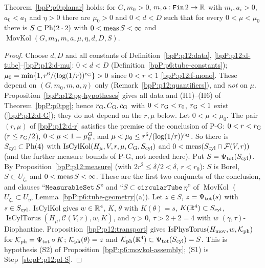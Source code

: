 \begin{theorem}\label{bpP:p12:planar}
Theorem~\ref{bpP:p0:planar} holds: for $G,m_0>0$, $m,a:\texttt{Fin}\,2\to\mathbb{R}$ with $m_i,a_i>0$, $a_0<a_1$ and $\eta>0$ there are $\mu_0>0$ and $0<d<D$ such that for every $0<\mu<\mu_0$ there is $S\subset\mathrm{Ph}(2\cdot2)$ with $0<\operatorname{meas} S<\infty$ and $\operatorname{MovKol}(G,m_0,m,a,\mu,\eta,d,D,S)$.
\end{theorem}
\begin{proof}
\label{stepP:p12:pl-const} Choose $d,D$ and all constants of Definition~\ref{bpP:p12:data}, \ref{bpP:p12:d-tube}--\ref{bpP:p12:d-mu}: $0<d<D$ (Definition~\ref{bpP:p6:tube-constants}); $\mu_0=\min\{1,r^6/(\log(1/r))^{c_{\rm G}}\}>0$ since $0<r<1$ \ref{bpP:p12:f-mono}. These depend on $(G,m_0,m,a,\eta)$ only (Remark~\ref{bpP:p12:quantifiers}), and \emph{not} on $\mu$.
\label{stepP:p12:pl-pg} Proposition~\ref{bpP:p12:pg-hypotheses} gives all data and (H1)--(H6) of Theorem~\ref{bpP:p0:pg}; hence $r_{\rm G},C_{\rm G},c_{\rm G}$ with $0<r_{\rm G}<r_0$, $r_{\rm G}<1$ exist (\ref{bpP:p12:d-G}); they do not depend on the $r,\mu$ below.
\label{stepP:p12:pl-mu} Let $0<\mu<\mu_0$. The pair $(r,\mu)$ of \ref{bpP:p12:d-r} satisfies the premise of the conclusion of P-G: $0<r<r_{\rm G}$ ($r\le r_{\rm G}/2$), $0<\mu<1=\mu_0^{\rm G}$, and $\mu<\mu_0\le r^6/(\log(1/r))^{c_{\rm G}}$. So there is $S_{\rm cyl}\subset\mathrm{Ph}(4)$ with $\operatorname{IsCylKol}(H_\mu,V,r,\mu,C_{\rm G},S_{\rm cyl})$ and $0<\operatorname{meas}(S_{\rm cyl}\cap\mathcal F(V,r))$ (and the further measure bounds of P-G, not needed here).
\label{stepP:p12:pl-S} Put $S=\Psi_{\rm tot}(S_{\rm cyl})$. By Proposition~\ref{bpP:p12:measure} (with $2r^2\le\delta/2<\delta$, $r<r_0$): $S$ is Borel, $S\subset U_{\zeta_*}$ and $0<\operatorname{meas} S<\infty$. These are the first two conjuncts of the conclusion, and clauses ``$\texttt{MeasurableSet}\ S$'' and ``$S\subset\texttt{circularTube}\ \eta$'' of $\operatorname{MovKol}$ ($U_{\zeta_*}\subset U_\eta$, Lemma~\ref{bpP:p6:tube-geometry}(a)).
\label{stepP:p12:pl-tori} Let $z\in S$, $z=\Psi_{\rm tot}(s)$ with $s\in S_{\rm cyl}$. IsCylKol gives $w\in\mathbb{R}^4$, $K$, $\theta$ with $K(\theta)=s$, $K(\mathbb{R}^4)\subset S_{\rm cyl}$, $\operatorname{IsCylTorus}(H_\mu,\mathcal C(V,r),w,K)$, and $\gamma>0$, $\tau>2+2=4$ with $w$ $(\gamma,\tau)$-Diophantine. Proposition~\ref{bpP:p12:transport} gives $\operatorname{IsPhysTorus}(H_{\rm mov},w,\mathcal K_{\rm ph})$ for $\mathcal K_{\rm ph}=\Psi_{\rm tot}\circ K$; $\mathcal K_{\rm ph}(\theta)=z$ and $\mathcal K_{\rm ph}(\mathbb{R}^4)\subset\Psi_{\rm tot}(S_{\rm cyl})=S$. This is hypothesis (S2) of Proposition~\ref{bpP:p6:movkol-assembly}; (S1) is Step~\ref{stepP:p12:pl-S}.

\end{proof}
